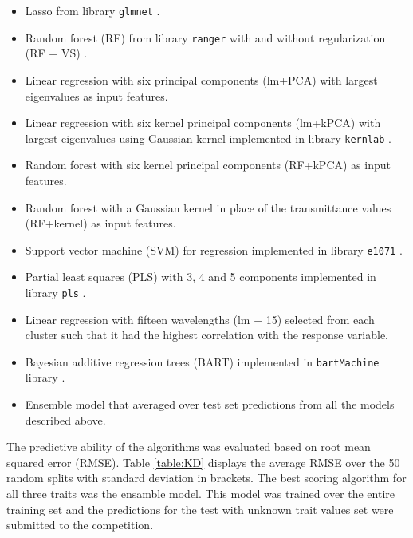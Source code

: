 \documentclass[a4paper,11pt]{article}
\begin{document}
\begin{itemize}
\item Lasso from library \texttt{glmnet} \citep{glmnet}.
\item Random forest (RF) from library \texttt{ranger} \citep{ranger} with and without regularization (RF + VS) \citep{regrf}.
\item Linear regression with six principal components (lm+PCA) with largest eigenvalues as input features.
\item Linear regression with six kernel principal components (lm+kPCA) with largest eigenvalues using Gaussian kernel implemented in library \texttt{kernlab} \citep{kernlab}.
\item Random forest with six kernel principal components (RF+kPCA) as input features.
\item Random forest with a Gaussian kernel in place of the transmittance values (RF+kernel) as input features.
\item Support vector machine (SVM) for regression implemented in library \texttt{e1071} \citep{e1071}.
\item Partial least squares (PLS) with 3, 4 and 5 components implemented in library \texttt{pls} \citep{pls}.
\item Linear regression with fifteen wavelengths (lm + 15) selected from each cluster such that it had the highest correlation with the response variable. 
\item Bayesian additive regression trees (BART) \citep{bart} implemented in \texttt{bartMachine} library \citep{bartMachine}.
\item Ensemble model that averaged over test set predictions from all the models described above.
\end{itemize}


The predictive ability of the algorithms was evaluated based on root mean squared error (RMSE). Table \ref{table:KD} displays the average RMSE over the 50 random splits with standard deviation in brackets. The best scoring algorithm for all three traits was the ensamble model. This model was trained over the entire training set and the predictions for the test with unknown trait values set were submitted to the competition. 
\end{document}
